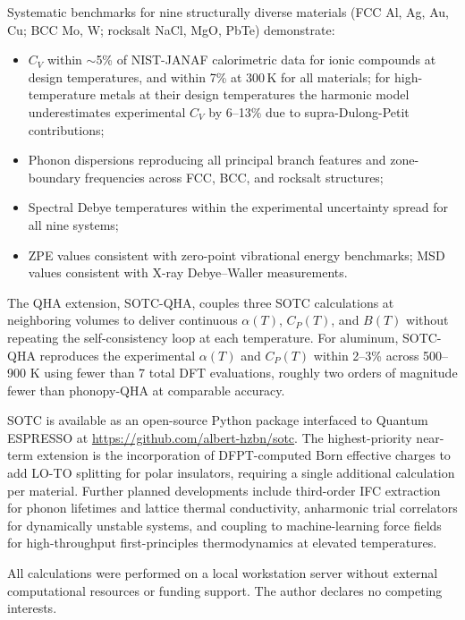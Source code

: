 \documentclass[aps,prb,reprint,amsmath,amssymb,floatfix]{revtex4-2}
\begin{document}
Systematic benchmarks for nine structurally diverse materials (FCC Al,
Ag, Au, Cu; BCC Mo, W; rocksalt NaCl, MgO, PbTe) demonstrate:
\begin{itemize}
  \item \(C_V\) within $\sim$5\% of NIST-JANAF calorimetric data for
    ionic compounds at design temperatures, and within 7\% at 300\,K for
    all materials; for high-temperature metals at their design
    temperatures the harmonic model underestimates experimental \(C_V\)
    by 6--13\% due to supra-Dulong-Petit contributions;
  \item Phonon dispersions reproducing all principal branch features and
    zone-boundary frequencies across FCC, BCC, and rocksalt structures;
  \item Spectral Debye temperatures within the experimental uncertainty
    spread for all nine systems;
  \item ZPE values consistent with zero-point vibrational energy
    benchmarks; MSD values consistent with X-ray Debye--Waller
    measurements.
\end{itemize}

The QHA extension, SOTC-QHA, couples three SOTC calculations at
neighboring volumes to deliver continuous \(\alpha(T)\), \(C_P(T)\), and
\(B(T)\) without repeating the self-consistency loop at each
temperature. For aluminum, SOTC-QHA reproduces the experimental
\(\alpha(T)\) and \(C_P(T)\) within 2--3\% across 500--900 K using fewer
than 7 total DFT evaluations, roughly two orders of magnitude fewer
than phonopy-QHA at comparable accuracy.

SOTC is available as an open-source Python package interfaced to Quantum
ESPRESSO at \url{https://github.com/albert-hzbn/sotc}. The
highest-priority near-term extension is the incorporation of
DFPT-computed Born effective charges to add LO-TO splitting for polar
insulators, requiring a single additional calculation per material.
Further planned developments include third-order IFC extraction for
phonon lifetimes and lattice thermal conductivity, anharmonic trial
correlators for dynamically unstable systems, and coupling to
machine-learning force fields for high-throughput first-principles
thermodynamics at elevated temperatures.


\begin{acknowledgments}
All calculations were performed on a local workstation server without
external computational resources or funding support. The author declares
no competing interests.
\end{acknowledgments}
\end{document}
